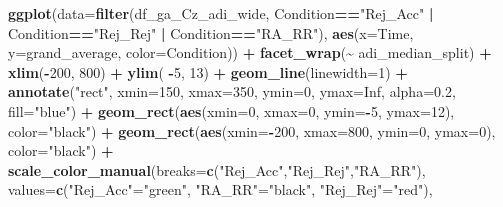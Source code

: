\documentclass[
]{article}
\newenvironment{Shaded}{\begin{snugshade}}{\end{snugshade}}
\newcommand{\AttributeTok}[1]{\textcolor[rgb]{0.13,0.29,0.53}{#1}}
\newcommand{\ConstantTok}[1]{\textcolor[rgb]{0.56,0.35,0.01}{#1}}
\newcommand{\DecValTok}[1]{\textcolor[rgb]{0.00,0.00,0.81}{#1}}
\newcommand{\FloatTok}[1]{\textcolor[rgb]{0.00,0.00,0.81}{#1}}
\newcommand{\FunctionTok}[1]{\textcolor[rgb]{0.13,0.29,0.53}{\textbf{#1}}}
\newcommand{\NormalTok}[1]{#1}
\newcommand{\OtherTok}[1]{\textcolor[rgb]{0.56,0.35,0.01}{#1}}
\newcommand{\SpecialCharTok}[1]{\textcolor[rgb]{0.81,0.36,0.00}{\textbf{#1}}}
\newcommand{\StringTok}[1]{\textcolor[rgb]{0.31,0.60,0.02}{#1}}
\begin{document}
\begin{Shaded}
\begin{Highlighting}[]
\FunctionTok{ggplot}\NormalTok{(}\AttributeTok{data=}\FunctionTok{filter}\NormalTok{(df\_ga\_Cz\_adi\_wide, Condition}\SpecialCharTok{==}\StringTok{"Rej\_Acc"} \SpecialCharTok{|}\NormalTok{ Condition}\SpecialCharTok{==}\StringTok{"Rej\_Rej"} \SpecialCharTok{|}\NormalTok{ Condition}\SpecialCharTok{==}\StringTok{"RA\_RR"}\NormalTok{), }\FunctionTok{aes}\NormalTok{(}\AttributeTok{x=}\NormalTok{Time, }\AttributeTok{y=}\NormalTok{grand\_average, }\AttributeTok{color=}\NormalTok{Condition)) }\SpecialCharTok{+}
  \FunctionTok{facet\_wrap}\NormalTok{(}\SpecialCharTok{\textasciitilde{}}\NormalTok{ adi\_median\_split) }\SpecialCharTok{+}
  \FunctionTok{xlim}\NormalTok{(}\SpecialCharTok{{-}}\DecValTok{200}\NormalTok{, }\DecValTok{800}\NormalTok{) }\SpecialCharTok{+}
  \FunctionTok{ylim}\NormalTok{( }\SpecialCharTok{{-}}\DecValTok{5}\NormalTok{, }\DecValTok{13}\NormalTok{) }\SpecialCharTok{+}
  \FunctionTok{geom\_line}\NormalTok{(}\AttributeTok{linewidth=}\DecValTok{1}\NormalTok{) }\SpecialCharTok{+}
  \FunctionTok{annotate}\NormalTok{(}\StringTok{"rect"}\NormalTok{, }\AttributeTok{xmin=}\DecValTok{150}\NormalTok{, }\AttributeTok{xmax=}\DecValTok{350}\NormalTok{, }\AttributeTok{ymin=}\DecValTok{0}\NormalTok{, }\AttributeTok{ymax=}\ConstantTok{Inf}\NormalTok{, }\AttributeTok{alpha=}\FloatTok{0.2}\NormalTok{, }\AttributeTok{fill=}\StringTok{"blue"}\NormalTok{) }\SpecialCharTok{+}
  \FunctionTok{geom\_rect}\NormalTok{(}\FunctionTok{aes}\NormalTok{(}\AttributeTok{xmin=}\DecValTok{0}\NormalTok{, }\AttributeTok{xmax=}\DecValTok{0}\NormalTok{, }\AttributeTok{ymin=}\SpecialCharTok{{-}}\DecValTok{5}\NormalTok{, }\AttributeTok{ymax=}\DecValTok{12}\NormalTok{), }\AttributeTok{color=}\StringTok{"black"}\NormalTok{) }\SpecialCharTok{+}
  \FunctionTok{geom\_rect}\NormalTok{(}\FunctionTok{aes}\NormalTok{(}\AttributeTok{xmin=}\SpecialCharTok{{-}}\DecValTok{200}\NormalTok{, }\AttributeTok{xmax=}\DecValTok{800}\NormalTok{, }\AttributeTok{ymin=}\DecValTok{0}\NormalTok{, }\AttributeTok{ymax=}\DecValTok{0}\NormalTok{), }\AttributeTok{color=}\StringTok{"black"}\NormalTok{) }\SpecialCharTok{+}
  \FunctionTok{scale\_color\_manual}\NormalTok{(}\AttributeTok{breaks=}\FunctionTok{c}\NormalTok{(}\StringTok{"Rej\_Acc"}\NormalTok{,}\StringTok{"Rej\_Rej"}\NormalTok{,}\StringTok{"RA\_RR"}\NormalTok{),}
                     \AttributeTok{values=}\FunctionTok{c}\NormalTok{(}\StringTok{"Rej\_Acc"}\OtherTok{=}\StringTok{"green"}\NormalTok{, }\StringTok{"RA\_RR"}\OtherTok{=}\StringTok{"black"}\NormalTok{, }\StringTok{"Rej\_Rej"}\OtherTok{=}\StringTok{"red"}\NormalTok{), }

\end{Highlighting}
\end{Shaded}
\end{document}
